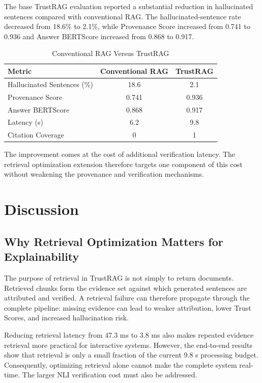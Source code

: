 \documentclass[conference]{IEEEtran}
\begin{document}
The base TrustRAG evaluation reported a substantial reduction in hallucinated sentences compared with conventional RAG. The hallucinated-sentence rate decreased from 18.6\% to 2.1\%, while Provenance Score increased from 0.741 to 0.936 and Answer BERTScore increased from 0.868 to 0.917.

\begin{table}[t]
\caption{Conventional RAG Versus TrustRAG}
\label{tab:comparison}
\centering
\small
\begin{tabular}{@{}lcc@{}}
\toprule
Metric & Conventional RAG & TrustRAG\\
\midrule
Hallucinated Sentences (\%) & 18.6 & 2.1\\
Provenance Score & 0.741 & 0.936\\
Answer BERTScore & 0.868 & 0.917\\
Latency (s) & 6.2 & 9.8\\
Citation Coverage & 0 & 1\\
\bottomrule
\end{tabular}
\end{table}

The improvement comes at the cost of additional verification latency. The retrieval optimization extension therefore targets one component of this cost without weakening the provenance and verification mechanisms.

\section{Discussion}

\subsection{Why Retrieval Optimization Matters for Explainability}

The purpose of retrieval in TrustRAG is not simply to return documents. Retrieved chunks form the evidence set against which generated sentences are attributed and verified. A retrieval failure can therefore propagate through the complete pipeline: missing evidence can lead to weaker attribution, lower Trust Scores, and increased hallucination risk.

Reducing retrieval latency from 47.3 ms to 3.8 ms also makes repeated evidence retrieval more practical for interactive systems. However, the end-to-end results show that retrieval is only a small fraction of the current 9.8 s processing budget. Consequently, optimizing retrieval alone cannot make the complete system real-time. The larger NLI verification cost must also be addressed.
\end{document}
